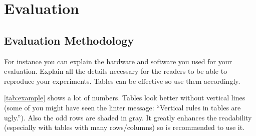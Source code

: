 \chapter{Evaluation}\label{ch:evaluation}

\section{Evaluation Methodology}\label{sec:methodology}

For instance you can explain the hardware and software you used for your evaluation.
Explain all the details necessary for the readers to be able to reproduce your experiments.
Tables can be effective so use them accordingly.

\begin{table}[ht]
  \centering
  \caption{A table with lots of numbers.}{
}
\end{table}

\cref{tab:example} shows a lot of numbers.
Tables look better without vertical lines (some of you might have seen the linter message: ``Vertical rules in tables are ugly.'').
Also the odd rows are shaded in gray.
It greatly enhances the readability (especially with tables with many rows/columns) so is recommended to use it.

